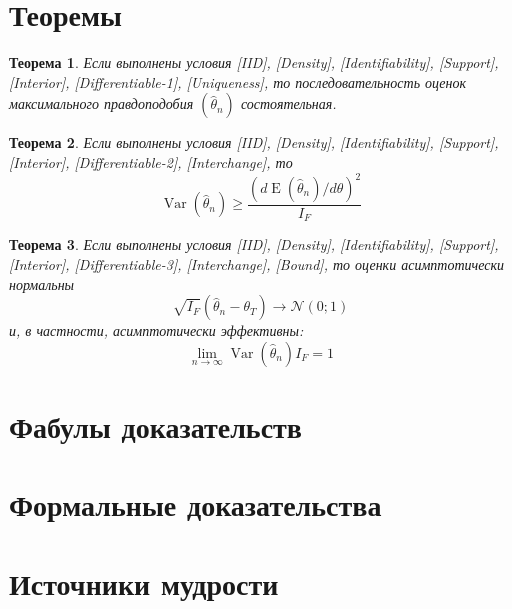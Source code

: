 \documentclass[12pt, a4paper]{article}
\DeclareMathOperator{\Var}{Var}
\DeclareMathOperator{\E}{E}
\newcommand{\cN}{\mathcal{N}}
\newtheorem{theorem}{Теорема}
\begin{document}
\section*{Теоремы}

\begin{theorem}
  Если выполнены условия [IID], [Density], [Identifiability], [Support], [Interior], [Differentiable-1], [Uniqueness], то 
  последовательность оценок максимального правдоподобия $(\hat \theta_n)$ состоятельная. 
\end{theorem}

\begin{theorem}
  Если выполнены условия [IID], [Density], [Identifiability], [Support], [Interior], [Differentiable-2], [Interchange], то 
  \[
  \Var(\hat \theta_n) \geq \frac{(d \E(\hat\theta_n) / d\theta )^2}{I_F}  
  \]
\end{theorem}

\begin{theorem}
  Если выполнены условия [IID], [Density], [Identifiability], [Support], [Interior], [Differentiable-3], [Interchange], [Bound], то 
  оценки асимптотически нормальны
  \[
     \sqrt{I_F} (\hat\theta_n - \theta_T) \to \cN(0;1)
  \]
  и, в частности, асимптотически эффективны:
  \[
  \lim_{n\to\infty} \Var(\hat \theta_n) I_F = 1  
  \]
\end{theorem}


\section*{Фабулы доказательств}

\section*{Формальные доказательства}

\section*{Источники мудрости}


\printbibliography[heading=none]
\end{document}
